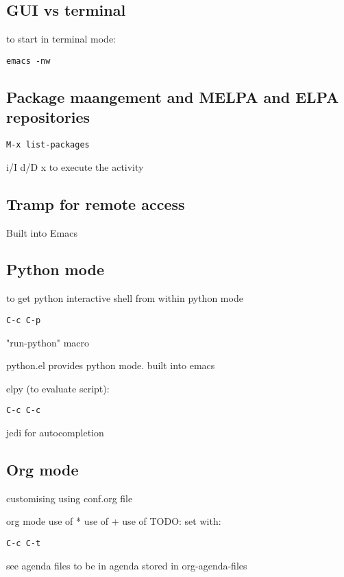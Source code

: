 \subsection{GUI vs terminal}

to start in terminal mode:
\begin{verbatim}
emacs -nw 
\end{verbatim}

\subsection{Package maangement and MELPA and ELPA repositories}

\begin{verbatim}
M-x list-packages
\end{verbatim}

i/I
d/D
x to execute the activity

\subsection{Tramp for remote access}

Built into Emacs

\subsection{Python mode}

to get python interactive shell from within python mode

\begin{verbatim}
C-c C-p
\end{verbatim}

"run-python" macro

python.el provides python mode. built into emacs

elpy (to evaluate script):
\begin{verbatim}
C-c C-c
\end{verbatim}

jedi for autocompletion


\subsection{Org mode}

customising using conf.org file



org mode
use of *
use of +
use of TODO: set with:

\begin{verbatim}
C-c C-t
\end{verbatim}
see agenda
files to be in agenda stored in org-agenda-files

